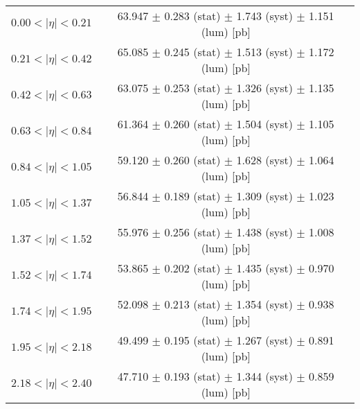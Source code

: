 \begin{tabular}{lc}
\hline
$0.00 < |\eta| <0.21$          & 63.947 $\pm$ 0.283 (stat) $\pm$ 1.743 (syst) $\pm$ 1.151 (lum) [pb]  \\
$0.21 < |\eta| <0.42$          & 65.085 $\pm$ 0.245 (stat) $\pm$ 1.513 (syst) $\pm$ 1.172 (lum) [pb]  \\
$0.42 < |\eta| <0.63$          & 63.075 $\pm$ 0.253 (stat) $\pm$ 1.326 (syst) $\pm$ 1.135 (lum) [pb]  \\
$0.63 < |\eta| <0.84$          & 61.364 $\pm$ 0.260 (stat) $\pm$ 1.504 (syst) $\pm$ 1.105 (lum) [pb]  \\
$0.84 < |\eta| <1.05$          & 59.120 $\pm$ 0.260 (stat) $\pm$ 1.628 (syst) $\pm$ 1.064 (lum) [pb]  \\
$1.05 < |\eta| <1.37$          & 56.844 $\pm$ 0.189 (stat) $\pm$ 1.309 (syst) $\pm$ 1.023 (lum) [pb]  \\
$1.37 < |\eta| <1.52$          & 55.976 $\pm$ 0.256 (stat) $\pm$ 1.438 (syst) $\pm$ 1.008 (lum) [pb]  \\
$1.52 < |\eta| <1.74$          & 53.865 $\pm$ 0.202 (stat) $\pm$ 1.435 (syst) $\pm$ 0.970 (lum) [pb]  \\
$1.74 < |\eta| <1.95$          & 52.098 $\pm$ 0.213 (stat) $\pm$ 1.354 (syst) $\pm$ 0.938 (lum) [pb]  \\
$1.95 < |\eta| <2.18$          & 49.499 $\pm$ 0.195 (stat) $\pm$ 1.267 (syst) $\pm$ 0.891 (lum) [pb]  \\
$2.18 < |\eta| <2.40$          & 47.710 $\pm$ 0.193 (stat) $\pm$ 1.344 (syst) $\pm$ 0.859 (lum) [pb]  \\
\hline
\end{tabular}

